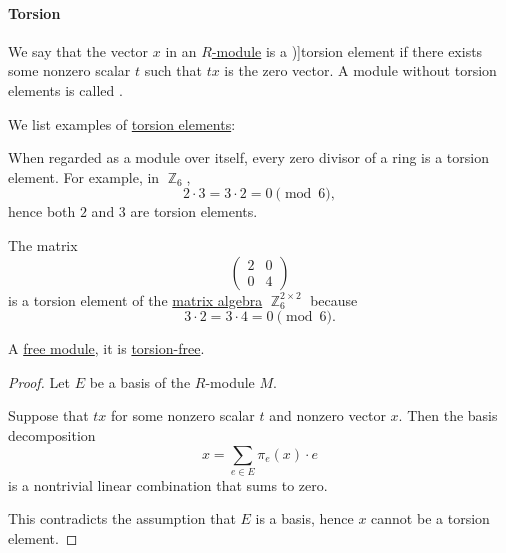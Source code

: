 \paragraph{Torsion}

\begin{definition}\label{def:module_torsion}
  We say that the vector \( x \) in an \hyperref[def:module]{\( R \)-module} is a \term[ru=элемент кручения (\cite[57]{Шафаревич1999ОсновныеПонятияАлгебры})]{torsion element} if there exists some nonzero scalar \( t \) such that \( tx \) is the zero vector. A module without torsion elements is called .
\end{definition}

\begin{example}\label{ex:def:module_torsion}
  We list examples of \hyperref[def:module_torsion]{torsion elements}:
  \begin{thmenum}
     When regarded as a module over itself, every zero divisor of a ring is a torsion element. For example, in \( \BbbZ_6 \),
    \begin{equation*}
      2 \cdot 3 = 3 \cdot 2 = 0 \pmod 6,
    \end{equation*}
    hence both \( 2 \) and \( 3 \) are torsion elements.

     The matrix
    \begin{equation*}
      \begin{pmatrix}
        2 & 0 \\
        0 & 4
      \end{pmatrix}
    \end{equation*}
    is a torsion element of the \hyperref[thm:matrix_algebra]{matrix algebra} \( \BbbZ_6^{2 \times 2} \) because
    \begin{equation*}
      3 \cdot 2 = 3 \cdot 4 = 0 \pmod 6.
    \end{equation*}
  \end{thmenum}
\end{example}

\begin{proposition}\label{thm:basis_implies_torsion_free}
  A \hyperref[rem:free_module]{free module}, it is \hyperref[def:module_torsion]{torsion-free}.
\end{proposition}
\begin{proof}
  Let \( E \) be a basis of the \( R \)-module \( M \).

  Suppose that \( tx \) for some nonzero scalar \( t \) and nonzero vector \( x \). Then the basis decomposition
  \begin{equation*}
    x = \sum_{e \in E} \pi_e(x) \cdot e
  \end{equation*}
  is a nontrivial linear combination that sums to zero.

  This contradicts the assumption that \( E \) is a basis, hence \( x \) cannot be a torsion element.
\end{proof}

